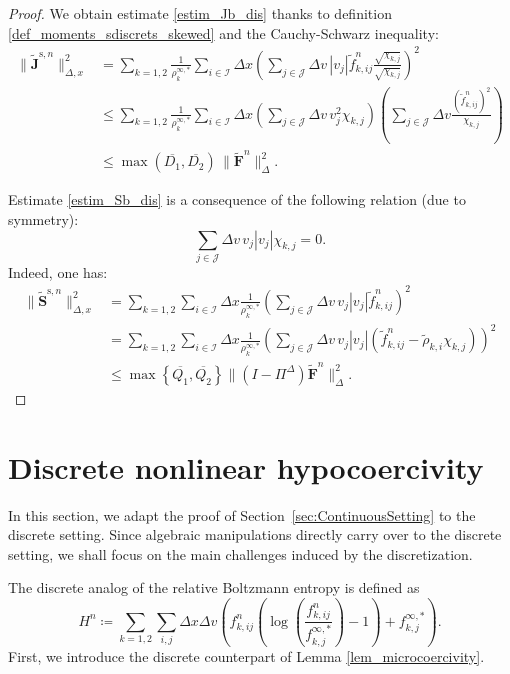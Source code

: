 \documentclass[reqno]{amsart}
\newcommand{\Dx}{\Delta x}
\newcommand{\Dv}{\Delta v}
\newcommand{\II}{\mathcal{I}}
\newcommand{\J}{\mathcal{J}}
\newcommand{\ft}{\widetilde{f}}
\newcommand{\Ft}{{\widetilde{F}}}
\newcommand{\rhot}{\widetilde{\rho}}
\newcommand{\Jt}{\widetilde{J}}
\newcommand{\St}{\widetilde{S}}
\newcommand{\Ftbf}{\mathbf{\Ft}}
\newcommand{\Jtbf}{\mathbf{\Jt}}
\newcommand{\Stbf}{\mathbf{\St}}
\newcommand{\lbr}{\left\lbrace}
\newcommand{\rbr}{\right\rbrace}
\numberwithin{equation}{section}
\begin{document}
\begin{proof}
    We obtain estimate \eqref{estim_Jb_dis} thanks to definition \eqref{def_moments_sdiscrets_skewed} and the Cauchy-Schwarz inequality: 
    \begin{align*}
    \|\Jtbf^{\mathrm{s},n}\|_{\Delta,x}^2&=\sum_{k=1,2}\frac{1}{\rho_k^{\infty,*}}\sum_{i\in\II}\Dx\left(\sum_{j\in\J}\Dv\,|v_j|\ft^n_{k,ij}\frac{\sqrt{\chi_{k,j}}}{\sqrt{\chi_{k,j}}}\right)^2\\
    &\leq \sum_{k=1,2}\frac{1}{\rho_k^{\infty,*}}\sum_{i\in\II}\Dx\left(\sum_{j\in\J}\Dv\, v_j^2\chi_{k,j}\right)\left(\sum_{j\in\J}\Dv\frac{\left(\ft^n_{k,ij}\right)^2}{\chi_{k,j}}\right)\\
    &\leq \max(\overline{D_1},\overline{D_2})\,\|\Ftbf^n\|_{\Delta}^2.
    \end{align*}

    Estimate \eqref{estim_Sb_dis} is a consequence of the following relation (due to symmetry): 
    \begin{equation*}
        \sum_{j\in\J}\Dv\, v_j|v_j|\chi_{k,j}=0.
    \end{equation*}
    Indeed, one has:
    \begin{equation}
        \begin{aligned}
            \|\Stbf^{\mathrm{s},n}\|_{\Delta,x}^2  &= \sum_{k=1,2}\sum_{i\in\II} \Dx\frac{1}{\rho^{\infty,*}_k}\left(\sum_{j\in\J}\Dv\, v_j|v_j|\ft^n_{k,ij}\right)^2\\
            &= \sum_{k=1,2}\sum_{i\in\II} \Dx\frac{1}{\rho^{\infty,*}_k}\left(\sum_{j\in\J}\Dv\, v_j|v_j|\left(\ft^n_{k,ij}-\rhot_{k,i}\chi_{k,j}\right)\right)^2\\
            &\leq \max\lbr \overline{Q_1}, \overline{Q_2} \rbr \|(I-\Pi^\Delta)\Ftbf^n\|_\Delta^2.
        \end{aligned}
    \end{equation}
\end{proof}

\section{Discrete nonlinear hypocoercivity}\label{sec:Hypoco}
In this section, we adapt the proof of Section~\ref{sec:ContinuousSetting} to the discrete setting. Since algebraic manipulations directly carry over to the discrete setting, we shall focus on the main challenges induced by the discretization.

The discrete analog of the relative Boltzmann entropy is defined as 
\begin{equation}\label{BoltzEntropy_d}
    H^n\coloneq \sum_{k=1,2}\sum_{i,j}\Dx\Dv\left(f_{k,ij}^n\left(\log\left(\frac{f_{k,ij}^n}{f_{k,j}^{\infty,*}}\right)-1\right)+f_{k,j}^{\infty,*}\right).
\end{equation}
First, we introduce the discrete counterpart of Lemma \ref{lem_microcoercivity}.
\end{document}
